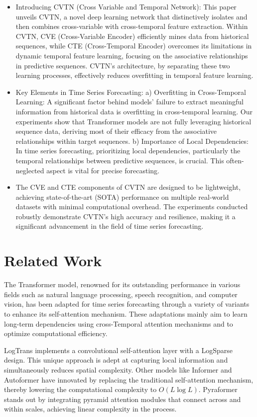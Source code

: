 \begin{itemize}
\item Introducing CVTN (Cross Variable and Temporal Network): This paper unveils CVTN, a novel deep learning network that distinctively isolates and then combines cross-variable with cross-temporal feature extraction. Within CVTN, CVE (Cross-Variable Encoder) efficiently mines data from historical sequences, while CTE (Cross-Temporal Encoder) overcomes its limitations in dynamic temporal feature learning, focusing on the associative relationships in predictive sequences. CVTN's architecture, by separating these two learning processes, effectively reduces overfitting in temporal feature learning.
\item Key Elements in Time Series Forecasting:
a) Overfitting in Cross-Temporal Learning: A significant factor behind models' failure to extract meaningful information from historical data is overfitting in cross-temporal learning. Our experiments show that Transformer models are not fully leveraging historical sequence data, deriving most of their efficacy from the associative relationships within target sequences.
b) Importance of Local Dependencies: In time series forecasting, prioritizing local dependencies, particularly the temporal relationships between predictive sequences, is crucial. This often-neglected aspect is vital for precise forecasting.
\item The CVE and CTE components of CVTN are designed to be lightweight, achieving state-of-the-art (SOTA) performance on multiple real-world datasets with minimal computational overhead. The experiments conducted robustly demonstrate CVTN's high accuracy and resilience, making it a significant advancement in the field of time series forecasting.
\end{itemize}

\section{Related Work}
The Transformer model, renowned for its outstanding performance in various fields such as natural language processing, speech recognition, and computer vision, has been adapted for time series forecasting through a variety of variants to enhance its self-attention mechanism. These adaptations mainly aim to learn long-term dependencies using cross-Temporal attention mechanisms and to optimize computational efficiency.

LogTrans\cite{li2019enhancing} implements a convolutional self-attention layer with a LogSparse design. This unique approach is adept at capturing local information and simultaneously reduces spatial complexity. Other models like Informer\cite{Zhou_Zhang_Peng_Zhang_Li_Xiong_Zhang_2022} and Autoformer\cite{wu2021autoformer} have innovated by replacing the traditional self-attention mechanism, thereby lowering the computational complexity to \(O(L \log L)\). Pyraformer\cite{liu2021pyraformer} stands out by integrating pyramid attention modules that connect across and within scales, achieving linear complexity in the process.

